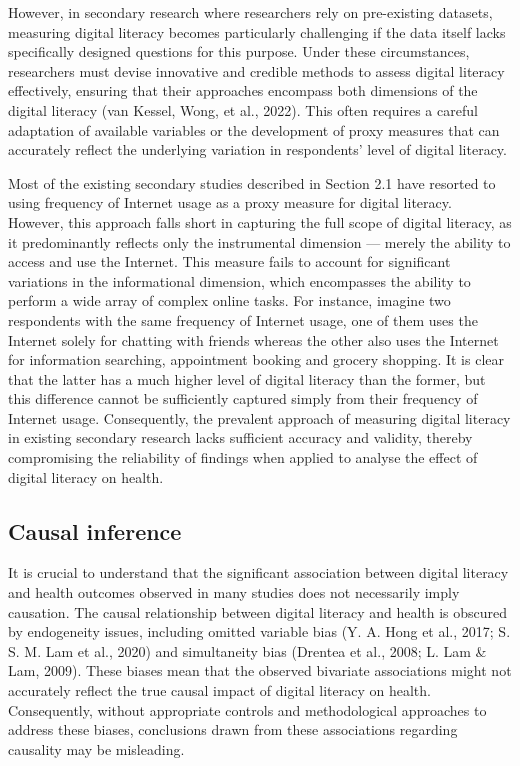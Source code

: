 However, in secondary research where researchers rely on pre-existing datasets, measuring digital literacy becomes particularly challenging if the data itself lacks specifically designed questions for this purpose. Under these circumstances, researchers must devise innovative and credible methods to assess digital literacy effectively, ensuring that their approaches encompass both dimensions of the digital literacy (van Kessel, Wong, et al., 2022). This often requires a careful adaptation of available variables or the development of proxy measures that can accurately reflect the underlying variation in respondents' level of digital literacy.

Most of the existing secondary studies described in Section 2.1 have resorted to using frequency of Internet usage as a proxy measure for digital literacy. However, this approach falls short in capturing the full scope of digital literacy, as it predominantly reflects only the instrumental dimension — merely the ability to access and use the Internet. This measure fails to account for significant variations in the informational dimension, which encompasses the ability to perform a wide array of complex online tasks. For instance, imagine two respondents with the same frequency of Internet usage, one of them uses the Internet solely for chatting with friends whereas the other also uses the Internet for information searching, appointment booking and grocery shopping. It is clear that the latter has a much higher level of digital literacy than the former, but this difference cannot be sufficiently captured simply from their frequency of Internet usage. Consequently, the prevalent approach of measuring digital literacy in existing secondary research lacks sufficient accuracy and validity, thereby compromising the reliability of findings when applied to analyse the effect of digital literacy on health.

\subsection{Causal inference}
It is crucial to understand that the significant association between digital literacy and health outcomes observed in many studies does not necessarily imply causation. The causal relationship between digital literacy and health is obscured by endogeneity issues, including omitted variable bias (Y. A. Hong et al., 2017; S. S. M. Lam et al., 2020) and simultaneity bias (Drentea et al., 2008; L. Lam \& Lam, 2009). These biases mean that the observed bivariate associations might not accurately reflect the true causal impact of digital literacy on health. Consequently, without appropriate controls and methodological approaches to address these biases, conclusions drawn from these associations regarding causality may be misleading.

